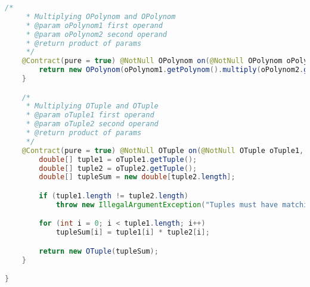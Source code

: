 \begin{lstlisting}[caption=Times (Falk),label=list:Times,language=Java]
    /*
     * Multiplying OPolynom and OPolynom
     * @param oPolynom1 first operand
     * @param oPolynom2 second operand
     * @return product of params
     */
    @Contract(pure = true) @NotNull OPolynom on(@NotNull OPolynom oPolynom1, @NotNull OPolynom oPolynom2) {
        return new OPolynom(oPolynom1.getPolynom().multiply(oPolynom2.getPolynom()));
    }

    /*
     * Multiplying OTuple and OTuple
     * @param oTuple1 first operand
     * @param oTuple2 second operand
     * @return product of params
     */
    @Contract(pure = true) @NotNull OTuple on(@NotNull OTuple oTuple1, @NotNull OTuple oTuple2) {
        double[] tuple1 = oTuple1.getTuple();
        double[] tuple2 = oTuple2.getTuple();
        double[] tupleSum = new double[tuple2.length];

        if (tuple1.length != tuple2.length)
            throw new IllegalArgumentException("Tuples must have matching size.");

        for (int i = 0; i < tuple1.length; i++)
            tupleSum[i] = tuple1[i] * tuple2[i];

        return new OTuple(tupleSum);
    }

}
\end{lstlisting}    

